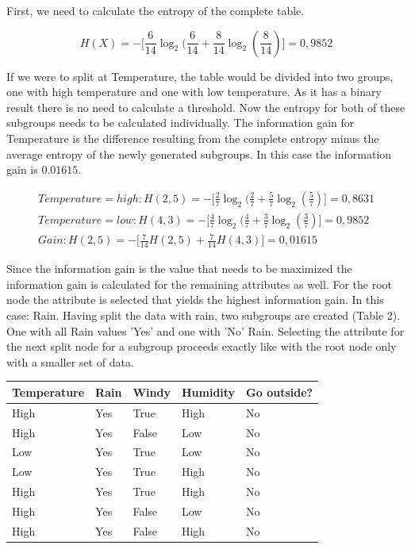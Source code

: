 \documentclass[
12pt,
headsepline,
bibliography=totoc,
twoside=semi,
]{scrartcl}
\begin{document}
 First, we need to calculate the entropy of the complete table. 

\begin{equation}\label{fig:fig8}
   H(X)= - \biggl[\frac{6}{14}\log_2(\frac{6}{14}+\frac{8}{14}\log_2(\frac{8}{14})\biggr]=0,9852
\end{equation}  

 If we were to split at Temperature, the table would be divided into two groups, one with high temperature and one with low temperature. As it has a binary result there is no need to calculate a threshold. Now the entropy for both of these subgroups needs to be calculated individually. The information gain for Temperature is the difference resulting from the complete entropy minus the average entropy of the newly generated subgroups. In this case the information gain is $0.01615$. 

 \begin{equation}\label{fig:fig7}
   \begin{split}
   Temperature=high: H(2,5)= -\biggl[\frac{2}{7}\log_2(\frac{2}{7}+\frac{5}{7}\log_2(\frac{5}{7})\biggr]=0,8631
   \\
   Temperature=low: H(4,3)= -\biggl[\frac{4}{7}\log_2(\frac{4}{7}+\frac{3}{7}\log_2(\frac{3}{7})\biggr]=0,9852
   \\
   Gain: H(2,5)= -\biggl[\frac{7}{14}H(2,5)+\frac{7}{14}H(4,3)\biggr]=0,01615
\end{split}
\end{equation}  

Since the information gain is the value that needs to be maximized the information gain is calculated for the remaining attributes as well. For the root node the attribute is selected that yields the highest information gain. In this case: Rain. 
Having split the data with rain, two subgroups are created (Table 2). One with all Rain values 'Yes' and one with 'No' Rain. Selecting the attribute for the next split node for a subgroup proceeds exactly like with the root node only with a smaller set of data.


\small\begin{table}[H]
   \begin{center}\begin{tabular}{|l|l|l|l||l|}
      \hline
      Temperature & Rain & Windy & Humidity & Go outside? \\
    \hline
    \hline
    High & Yes & True & High & No \\
    \hline
    High&  Yes& False & Low & No \\
    \hline
    Low& Yes & True & Low & No \\
    \hline
    Low&  Yes& True & High & No \\
    \hline
    High&  Yes& True & High &  No\\
    \hline
    High&  Yes&  False& Low & No \\
    \hline
    High& Yes & False & High & No\\
    \hline
   \end{tabular}\end{center}
   \label{fig:fig101}
   \end{table}
\end{document}
